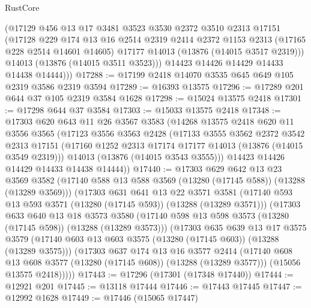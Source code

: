 \begin{lexlean}{RustCore}
\begin{coremodule}
          (@17129
            @456
            @13
            @17
            @3481
            @3523
            @3530
            @2372
            @3510
            @2313
            @17151
            (@17128
              @229
              @174
              @13
              @16
              @2514
              @2319
              @2414
              @2372
              @1153
              @2313
              (@17165 @228 @2514 @14601 @14605)
              @17177
              @14013
              (@13876 (@14015 @3517 @2319)))
            @14013
            (@13876 (@14015 @3511 @3523)))
          @14423
          @14426
          @14429
          @14433
          @14438
          @14444)))
@17288 := @17199 @2418 @14070 @3535 @645 @649 @105 @2319 @3586 @2319 @3594
@17289 := @16393 @13575
@17296 := @17289 @201 @644 @37 @105 @2319 @3584 @1628
@17298 := @15024 @13575 @2418
@17301 := @17298 @644 @37 @3584
@17303 := @15033 @13575 @2418
@17348 := @17303
    @620
    @643
    @11
    @26
    @3567
    @3583
    (@14268
      @13575
      @2418
      @620
      @11
      @3556
      @3565
      (@17123
        @3556
        @3563
        @2428
        (@17133
          @3555
          @3562
          @2372
          @3542
          @2313
          @17151
          (@17160 @1252 @2313 @17174 @17177 @14013 (@13876 (@14015 @3549 @2319)))
          @14013
          (@13876 (@14015 @3543 @3555)))
        @14423
        @14426
        @14429
        @14433
        @14438
        @14444))
@17440 := @17303
    @629
    @642
    @13
    @23
    @3569
    @3582
    (@17140 @588 @13 @588 @3569 (@13280 (@17145 @588)) (@13288 (@13289 @3569)))
    (@17303
      @631
      @641
      @13
      @22
      @3571
      @3581
      (@17140 @593 @13 @593 @3571 (@13280 (@17145 @593)) (@13288 (@13289 @3571)))
      (@17303
        @633
        @640
        @13
        @18
        @3573
        @3580
        (@17140 @598 @13 @598 @3573 (@13280 (@17145 @598)) (@13288 (@13289 @3573)))
        (@17303
          @635
          @639
          @13
          @17
          @3575
          @3579
          (@17140 @603 @13 @603 @3575 (@13280 (@17145 @603)) (@13288 (@13289 @3575)))
          (@17303
            @637
            @174
            @13
            @16
            @3577
            @2414
            (@17140 @608 @13 @608 @3577 (@13280 (@17145 @608)) (@13288 (@13289 @3577)))
            (@15056 @13575 @2418)))))
@17443 := @17296 (@17301 (@17348 @17440))
@17444 := @12921 @201
@17445 := @13118 @17444
@17446 := @17443 @17445
@17447 := @12992 @1628
@17449 := @17446 (@15065 @17447)

\end{coremodule}
\end{lexlean}
